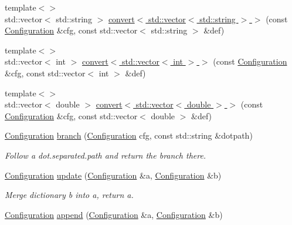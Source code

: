 \begin{DoxyCompactItemize}
\item 
{\footnotesize template$<$$>$ }\\std\+::vector$<$ std\+::string $>$ \hyperlink{namespace_wire_cell_a0d9a7424eee11d76d9a8ead48e8b3642}{convert$<$ std\+::vector$<$ std\+::string $>$ $>$} (const \hyperlink{namespace_wire_cell_a9f705541fc1d46c608b3d32c182333ee}{Configuration} \&cfg, const std\+::vector$<$ std\+::string $>$ \&def)
\item 
{\footnotesize template$<$$>$ }\\std\+::vector$<$ int $>$ \hyperlink{namespace_wire_cell_a26f264ab9870372316e8c325576e097b}{convert$<$ std\+::vector$<$ int $>$ $>$} (const \hyperlink{namespace_wire_cell_a9f705541fc1d46c608b3d32c182333ee}{Configuration} \&cfg, const std\+::vector$<$ int $>$ \&def)
\item 
{\footnotesize template$<$$>$ }\\std\+::vector$<$ double $>$ \hyperlink{namespace_wire_cell_abb75ebf5f2ee143cd568e7d8db4f4db4}{convert$<$ std\+::vector$<$ double $>$ $>$} (const \hyperlink{namespace_wire_cell_a9f705541fc1d46c608b3d32c182333ee}{Configuration} \&cfg, const std\+::vector$<$ double $>$ \&def)
\item 
\hyperlink{namespace_wire_cell_a9f705541fc1d46c608b3d32c182333ee}{Configuration} \hyperlink{namespace_wire_cell_ade8a8d63c0beb7335d7f969903bfeedc}{branch} (\hyperlink{namespace_wire_cell_a9f705541fc1d46c608b3d32c182333ee}{Configuration} cfg, const std\+::string \&dotpath)
\begin{DoxyCompactList}\small\item\em Follow a dot.\+separated.\+path and return the branch there. \end{DoxyCompactList}\item 
\hyperlink{namespace_wire_cell_a9f705541fc1d46c608b3d32c182333ee}{Configuration} \hyperlink{namespace_wire_cell_a5d4ad22423a3c77cc4f57d3a7aa95f49}{update} (\hyperlink{namespace_wire_cell_a9f705541fc1d46c608b3d32c182333ee}{Configuration} \&a, \hyperlink{namespace_wire_cell_a9f705541fc1d46c608b3d32c182333ee}{Configuration} \&b)
\begin{DoxyCompactList}\small\item\em Merge dictionary b into a, return a. \end{DoxyCompactList}\item 
\hyperlink{namespace_wire_cell_a9f705541fc1d46c608b3d32c182333ee}{Configuration} \hyperlink{namespace_wire_cell_acbed381be380ba3a92f80dc5bbcac91f}{append} (\hyperlink{namespace_wire_cell_a9f705541fc1d46c608b3d32c182333ee}{Configuration} \&a, \hyperlink{namespace_wire_cell_a9f705541fc1d46c608b3d32c182333ee}{Configuration} \&b)

\end{DoxyCompactItemize}
